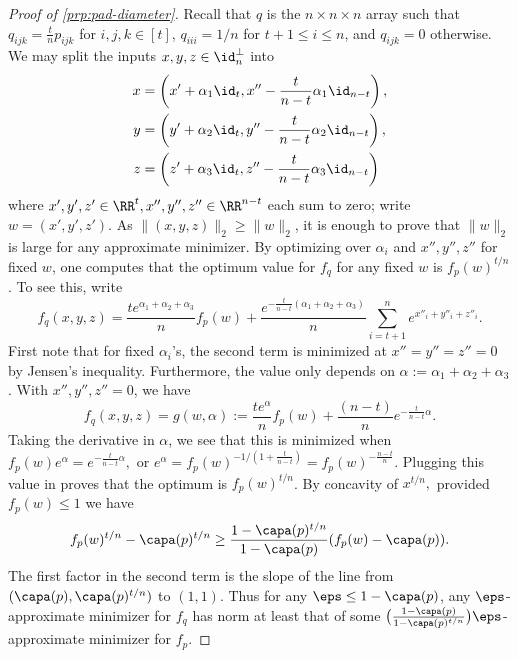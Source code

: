 \begin{proof}[Proof of \cref{prp:pad-diameter}]
Recall that $q$ is the $n\times n \times n$ array such that $q_{ijk} = \frac{t}{n} p_{ijk}$ for $i,j,k \in [t]$, $q_{iii} = 1/n$ for $t+1 \leq i \leq n$, and $q_{ijk} = 0$ otherwise. We may split the inputs $x,y,z \in \id_n^\perp$ into 
\begin{align*}x & =\left(x' + \alpha_1 \id_t ,x'' - \frac{t}{n-t} \alpha_1 \id_{n-t}\right),\\
 y&=\left(y' + \alpha_2 \id_t, y'' - \frac{t}{n-t} \alpha_2 \id_{n-t}\right),\\
 z& = \left(z'+ \alpha_3 \id_t ,z''- \frac{t}{n-t} \alpha_3 \id_{n-t}\right)
\end{align*} where $x',y',z' \in \RR^{t}, x'', y'', z'' \in \RR^{n-t}$ each sum to zero; write $w = (x',y',z')$. As $\| (x,y,z)\|_2 \geq \|w\|_2$, it is enough to prove that $\|w\|_2$ is large for any approximate minimizer. By optimizing over $\alpha_i$ and $x'', y'', z''$ for fixed $w$, one computes that the optimum value for $f_q$ for any fixed $w$ is $f_p(w)^{t/n}$. To see this, write
$$ f_q(x,y,z) = \frac{t e^{\alpha_1 + \alpha_2 + \alpha_3}}{n} f_p(w) + \frac{e^{ -\frac{t}{n - t} (\alpha_1 + \alpha_2 + \alpha_3)} }{n} \sum_{i = t+1}^n e^{x''_i + y''_i + z''_i}.$$
First note that for fixed $\alpha_i$'s, the second term is minimized at $x'' = y'' = z'' = 0$ by Jensen's inequality. Furthermore, the value only depends on $\alpha:= \alpha_1 + \alpha_2 + \alpha_3$. With $x'',y'',z'' = 0$, we have
$$ f_q(x,y,z) =g(w, \alpha):= \frac{t e^{\alpha}}{n} f_p(w) + \frac{(n - t) }{n} e^{- \frac{t}{n - t} \alpha}.$$
Taking the derivative in $\alpha$, we see that this is minimized when $ f_p(w) e^{\alpha} = e^{- \frac{t}{n - t} \alpha},$ or $e^{\alpha} = f_p(w)^{-1/(1 + \frac{t}{n-t})} = f_p(w)^{-\frac{n-t}{n}}.$ Plugging this value in proves that the optimum is $f_p(w)^{t/n}$.
By concavity of $x^{t/n},$ provided $f_p(w) \leq 1$ we have 
$$f_p(w)^{t/n} - \capa(p)^{t/n} \geq \frac{1 - \capa(p)^{t/n}}{1 - \capa(p)} (f_p(w) - \capa(p)).$$
The first factor in the second term is the slope of the line from $(\capa(p), \capa(p)^{t/n})$ to $(1,1)$. Thus for any $\eps \leq 1 - \capa(p)$, any $\eps$-approximate minimizer for $f_q$ has norm at least that of some $\big( \frac{1 - \capa(p)}{1 - \capa(p)^{t/n}} \big)\eps$-approximate minimizer for $f_p$.
\end{proof}









































